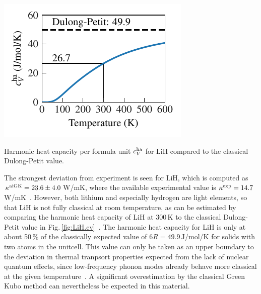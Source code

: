 \begin{marginfigure}
	\includegraphics[width=\textwidth]{./data/plots/heat_capacity/225.LiH/thermal_properties.pdf}
	\caption{Harmonic heat capacity per formula unit $c_V^{\rm ha}$ for LiH compared to the classical Dulong-Petit value.}
	\label{fig:LiH.cv}
\end{marginfigure}
%
The strongest deviation from experiment is seen for LiH, which is computed as $\kappa^{\rm aiGK} = 23.6 \pm 4.0$\,W/mK, where the available experimental value is $\kappa^{\rm exp} = 14.7$\,W/mK~\cite{slack1973}. However, both lithium and especially hydrogen are light elements, so that LiH is not fully classical at room temperature, as can be estimated by comparing the harmonic heat capacity of LiH at 300\,K to the classical Dulong-Petit value in Fig.\,\ref{fig:LiH.cv}~\cite{Dove}. The harmonic heat capacity for LiH is only at about 50\,\% of the classically expected value of $6 R = 49.9$\,J/mol/K for solids with two atoms in the unitcell. This value can only be taken as an upper boundary to the deviation in thermal tranpsort properties expected from the lack of nuclear quantum effects, since low-frequency phonon modes already behave more classical at the given temperature~\cite{Volz2020,Volz2020b}.  A significant overestimation by the classical Green Kubo method can nevertheless be expected in this material. 
